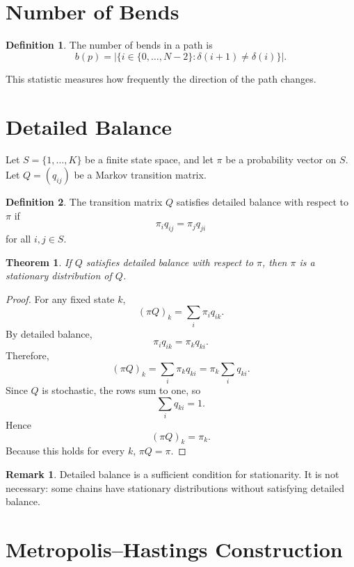 \documentclass[12pt,oneside]{book}
\numberwithin{equation}{section}
\theoremstyle{definition}
\newtheorem{definition}{Definition}[section]
\newtheorem{remark}{Remark}[section]
\theoremstyle{plain}
\newtheorem{theorem}{Theorem}[section]
\theoremstyle{remark}
\begin{document}
\section{Number of Bends}

\begin{definition}
The number of bends in a path is
\[
b(p)
=
\left|\{i\in\{0,\ldots,N-2\}:\delta(i+1)\neq \delta(i)\}\right|.
\]
\end{definition}

This statistic measures how frequently the direction of the path changes.

\section{Detailed Balance}

Let $S=\{1,\ldots,K\}$ be a finite state space, and let $\pi$ be a probability vector on $S$. Let $Q=(q_{ij})$ be a Markov transition matrix.

\begin{definition}
The transition matrix $Q$ satisfies detailed balance with respect to $\pi$ if
\[
\pi_i q_{ij}=\pi_j q_{ji}
\]
for all $i,j\in S$.
\end{definition}

\begin{theorem}
If $Q$ satisfies detailed balance with respect to $\pi$, then $\pi$ is a stationary distribution of $Q$.
\end{theorem}

\begin{proof}
For any fixed state $k$,
\[
(\pi Q)_k
=
\sum_i \pi_i q_{ik}.
\]
By detailed balance,
\[
\pi_i q_{ik}=\pi_k q_{ki}.
\]
Therefore,
\[
(\pi Q)_k
=
\sum_i \pi_k q_{ki}
=
\pi_k\sum_i q_{ki}.
\]
Since $Q$ is stochastic, the rows sum to one, so
\[
\sum_i q_{ki}=1.
\]
Hence
\[
(\pi Q)_k=\pi_k.
\]
Because this holds for every $k$, $\pi Q=\pi$.
\end{proof}

\begin{remark}
Detailed balance is a sufficient condition for stationarity. It is not necessary: some chains have stationary distributions without satisfying detailed balance.
\end{remark}

\section{Metropolis--Hastings Construction}
\end{document}
